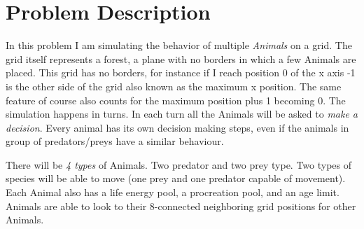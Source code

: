 \documentclass[11pt]{article}
\begin{document}


\section*{Problem Description}

In this problem I am simulating the behavior of multiple \emph{Animals} on a grid. The grid itself represents a forest, a plane with no borders in which a few Animals are placed. This grid has no borders, for instance if I reach position 0 of the x axis -1 is the other side of the grid also known as the maximum x position. The same feature of course also counts for the maximum position plus 1 becoming 0. The simulation happens in turns. In each turn all the Animals will be asked to \emph{make a decision}. Every animal has its own decision making steps, even if the animals in group of predators/preys have a similar behaviour.

There will be \emph{4 types} of Animals. Two predator and two prey type. Two types of species will be able to move (one prey and one predator capable of movement). Each Animal also has a life energy pool, a procreation pool, and an age limit. Animals are able to look to their 8-connected neighboring grid positions for other Animals.
\end{document}
